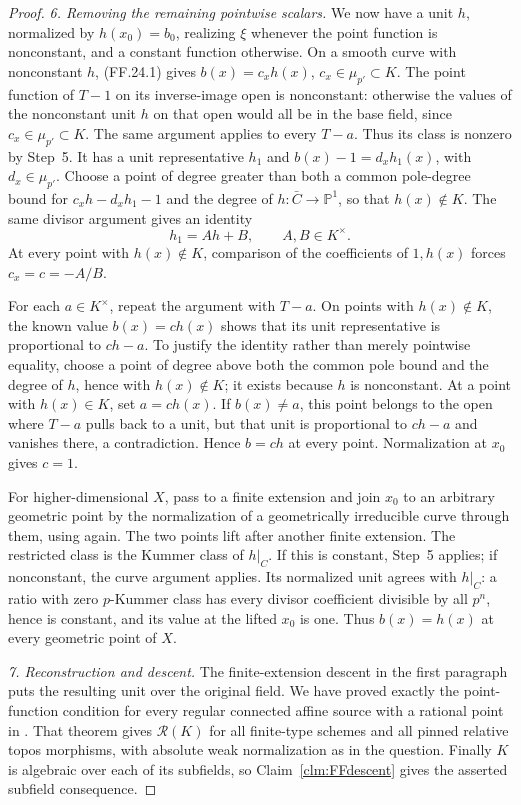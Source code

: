 \begin{proof}
\emph{6. Removing the remaining pointwise scalars.}
We now have a unit \(h\), normalized by
\(h(x_0)=b_0\), realizing \(\xi\) whenever
the point function is nonconstant, and a constant
function otherwise. On a smooth curve with
nonconstant \(h\), (FF.24.1) gives
\(b(x)=c_xh(x)\), \(c_x\in\mu_{p'}\subset K\).
The point function of \(T-1\) on its inverse-image
open is nonconstant: otherwise the values of the
nonconstant unit \(h\) on that open would all be
in the base field, since \(c_x\in\mu_{p'}\subset K\).
The same argument applies to every \(T-a\). Thus its
class is nonzero by
Step~5. It has a unit representative \(h_1\)
and \(b(x)-1=d_xh_1(x)\), with \(d_x\in\mu_{p'}\).
Choose a point of degree greater than both a common
pole-degree bound for \(c_xh-d_xh_1-1\) and the
degree of \(h:\bar C\to\mathbb P^1\), so that
\(h(x)\notin K\). The
same divisor argument gives an identity
\[
                           h_1=Ah+B,
                              \qquad A,B\in K^\times.
\]
At every point with \(h(x)\notin K\), comparison
of the coefficients of \(1,h(x)\) forces
\(c_x=c=-A/B\).

For each \(a\in K^\times\), repeat the argument
with \(T-a\). On points with \(h(x)\notin K\),
the known value \(b(x)=ch(x)\) shows that its
unit representative is proportional to \(ch-a\).
To justify the identity rather than merely pointwise
equality, choose a point of degree above both the common
pole bound and the degree of \(h\), hence with
\(h(x)\notin K\); it exists because
\(h\) is nonconstant. At a point with
\(h(x)\in K\), set \(a=ch(x)\). If
\(b(x)\ne a\), this point belongs to the open
where \(T-a\) pulls back to a unit, but that
unit is proportional to \(ch-a\) and vanishes
there, a contradiction. Hence \(b=ch\) at
every point. Normalization at \(x_0\) gives
\(c=1\).

For higher-dimensional \(X\), pass to a finite
extension and join \(x_0\) to an arbitrary geometric
point by the normalization of a geometrically
irreducible curve through them, using
\citep[Corollary~1.9]{FF_CharlesPoonen2016} again.
The two points lift after another finite extension.
The restricted class is the Kummer class of
\(h|_C\). If this is constant, Step~5 applies;
if nonconstant, the curve argument applies. Its
normalized unit agrees with \(h|_C\): a ratio
with zero \(p\)-Kummer class has every divisor
coefficient divisible by all \(p^n\), hence is
constant, and its value at the lifted \(x_0\)
is one. Thus \(b(x)=h(x)\) at every geometric
point of \(X\).

\emph{7. Reconstruction and descent.}
The finite-extension descent in the first paragraph
puts the resulting unit over the original field.
We have proved exactly the point-function condition
for every regular connected affine source with a
rational point in
\citet[Theorem~4.18(5)]{FF_CHW2024}.
That theorem gives \(\mathcal R(K)\) for all
finite-type schemes and all pinned relative topos
morphisms, with absolute weak normalization as
in the question. Finally \(K\) is algebraic over
each of its subfields, so
Claim~\ref{clm:FFdescent} gives the asserted
subfield consequence.
\end{proof}
